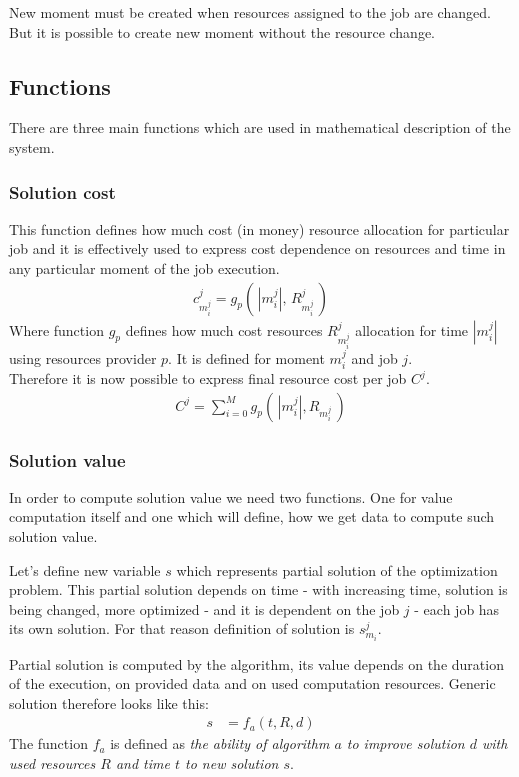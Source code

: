 New moment must be created when resources assigned to the job are changed.
But it is possible to create new moment without the resource change.

\subsection{Functions}\label{subsec:detailed-functions}

There are three main functions which are used in mathematical description of the system.

\subsubsection{Solution cost}
This function defines how much cost (in money) resource allocation for particular job
and it is effectively used to express cost dependence on resources and time in any particular moment of the job execution.
\begin{align*}
	c_{m_{i}^{j}}^{j} = g_{p} (\, |m_{i}^{j}|,\, R_{m_{i}^{j}}^{j} \,) 
\end{align*}
Where function $g_{p}$ defines how much cost resources $R_{m_{i}^{j}}^{j}$ allocation for time $|m_{i}^{j}|$ using resources provider $p$.
It is defined for moment $m_{i}^{j}$ and job $j$.\\
Therefore it is now possible to express final resource cost per job $C^{j}$.
\begin{align*}
	C^{j} = \sum_{i = 0}^{M} g_{p} (\, |m_{i}^{j}|, R_{m_{i}^{j}} \,) 
\end{align*}

\subsubsection{Solution value}
In order to compute solution value we need two functions.
One for value computation itself and one which will define,
how we get data to compute such solution value.

Let's define new variable $s$ which represents partial solution of the optimization problem.
This partial solution depends on time - with increasing time, solution is being changed, more optimized -
and it is dependent on the job $j$ - each job has its own solution.
For that reason definition of solution is $s_{m_{i}}^{j}$.

Partial solution is computed by the algorithm,
its value depends on the duration of the execution,
on provided data and on used computation resources.
Generic solution therefore looks like this:
\begin{align*}
	s & = f_a(t, R, d) 
\end{align*}
The function $f_{a}$ is defined as \textit{the ability of algorithm $a$ to improve solution $d$ with used resources $R$ and time $t$ to new solution $s$}.

